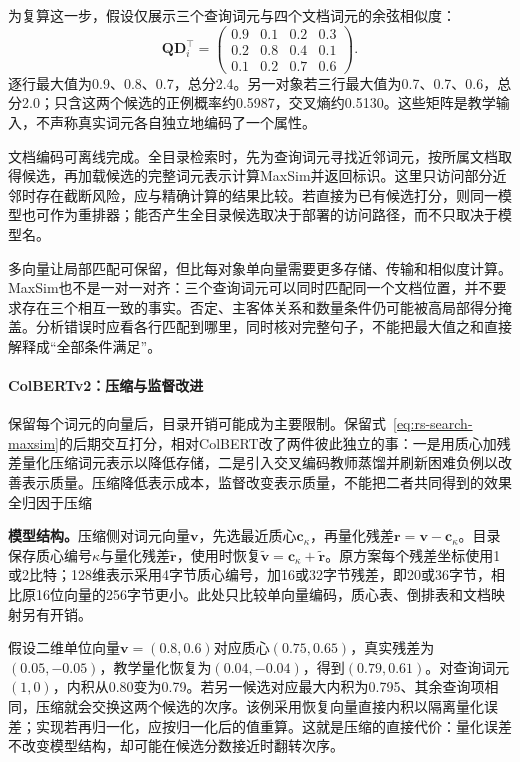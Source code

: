 为复算这一步，假设仅展示三个查询词元与四个文档词元的余弦相似度：
\[
 \bm Q\bm D_i^\top=
 \begin{pmatrix}
 0.9&0.1&0.2&0.3\\
 0.2&0.8&0.4&0.1\\
 0.1&0.2&0.7&0.6
 \end{pmatrix}.
\]
逐行最大值为0.9、0.8、0.7，总分2.4。另一对象若三行最大值为0.7、0.7、0.6，总分2.0；只含这两个候选的正例概率约0.5987，交叉熵约0.5130。这些矩阵是教学输入，不声称真实词元各自独立地编码了一个属性。

文档编码可离线完成。全目录检索时，先为查询词元寻找近邻词元，按所属文档取得候选，再加载候选的完整词元表示计算MaxSim并返回标识。这里只访问部分近邻时存在截断风险，应与精确计算的结果比较。若直接为已有候选打分，则同一模型也可作为重排器；能否产生全目录候选取决于部署的访问路径，而不只取决于模型名。

多向量让局部匹配可保留，但比每对象单向量需要更多存储、传输和相似度计算。MaxSim也不是一对一对齐：三个查询词元可以同时匹配同一个文档位置，并不要求存在三个相互一致的事实。否定、主客体关系和数量条件仍可能被高局部得分掩盖。分析错误时应看各行匹配到哪里，同时核对完整句子，不能把最大值之和直接解释成“全部条件满足”。

\Needspace{100mm}
\paragraph{ColBERTv2：压缩与监督改进}
\label{sec:rs-search-colbertv2}

保留每个词元的向量后，目录开销可能成为主要限制。保留式~\eqref{eq:rs-search-maxsim}的后期交互打分，相对ColBERT改了两件彼此独立的事：一是用质心加残差量化压缩词元表示以降低存储，二是引入交叉编码教师蒸馏并刷新困难负例以改善表示质量。压缩降低表示成本，监督改变表示质量，不能把二者共同得到的效果全归因于压缩

\textbf{模型结构。}压缩侧对词元向量$\bm v$，先选最近质心$\bm c_{\kappa}$，再量化残差$\bm r=\bm v-\bm c_{\kappa}$。目录保存质心编号$\kappa$与量化残差$\widetilde{\bm r}$，使用时恢复$\widetilde{\bm v}=\bm c_{\kappa}+\widetilde{\bm r}$。原方案每个残差坐标使用1或2比特；128维表示采用4字节质心编号，加16或32字节残差，即20或36字节，相比原16位向量的256字节更小。此处只比较单向量编码，质心表、倒排表和文档映射另有开销。

假设二维单位向量$\bm v=(0.8,0.6)$对应质心$(0.75,0.65)$，真实残差为$(0.05,-0.05)$，教学量化恢复为$(0.04,-0.04)$，得到$(0.79,0.61)$。对查询词元$(1,0)$，内积从0.80变为0.79。若另一候选对应最大内积为0.795、其余查询项相同，压缩就会交换这两个候选的次序。该例采用恢复向量直接内积以隔离量化误差；实现若再归一化，应按归一化后的值重算。这就是压缩的直接代价：量化误差不改变模型结构，却可能在候选分数接近时翻转次序。

